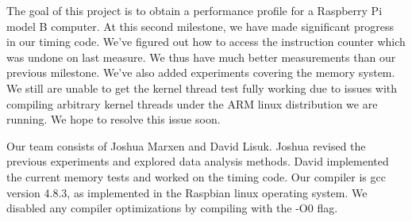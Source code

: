 The goal of this project is to obtain a performance profile for a Raspberry Pi model B computer. At this second milestone, we have made significant progress in our timing code.  We've figured out how to access the instruction counter which was undone on last measure.  We thus have much better measurements than our previous milestone.  We've also added experiments covering the memory system.  We still are unable to get the kernel thread test fully working due to issues with compiling arbitrary kernel threads under the ARM linux distribution we are running.  We hope to resolve this issue soon.

Our team consists of Joshua Marxen and David Lisuk. Joshua revised the previous experiments and explored data analysis methods.  David implemented the current memory tests and worked on the timing code. Our compiler is gcc version 4.8.3, as implemented in the Raspbian linux operating system. We disabled any compiler optimizations by compiling with the -O0 flag.